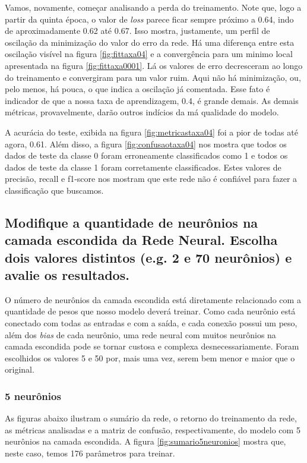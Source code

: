 \documentclass[12pt]{article}
\begin{document}
Vamos, novamente, começar analisando a perda do treinamento. Note que, logo a partir da quinta época, o valor de \textit{loss} parece ficar sempre próximo a 0.64, indo de aproximadamente 0.62 até 0.67. Isso mostra, justamente, um perfil de oscilação da minimização do valor do erro da rede. Há uma diferença entre esta oscilação visível na figura \ref{fig:fittaxa04} e a convergência para um minimo local apresentada na figura \ref{fig:fittaxa0001}. Lá os valores de erro decresceram ao longo do treinamento e convergiram para um valor ruim. Aqui não há minimização, ou, pelo menos, há pouca, o que indica a oscilação já comentada. Esse fato é indicador de que a nossa taxa de aprendizagem, 0.4, é grande demais. As demais métricas, provavelmente, darão outros indícios da má qualidade do modelo.

A acurácia do teste, exibida na figura \ref{fig:metricastaxa04} foi a pior de todas até agora, 0.61. Além disso, a figura \ref{fig:confusaotaxa04} nos mostra que todos os dados de teste da classe 0 foram erroneamente classificados como 1 e todos os dados de teste da classe 1 foram corretamente classificados. Estes valores de precisão, recall e f1-score nos mostram que este rede não é confiável para fazer a classificação que buscamos. 

\subsection{Modifique a quantidade de neurônios na camada escondida da Rede Neural. Escolha dois valores distintos (e.g. 2 e 70 neurônios) e avalie os	resultados.}

O número de neurônios da camada escondida está diretamente relacionado com a quantidade de pesos que nosso modelo deverá treinar. Como cada neurônio está conectado com todas as entradas e com a saída, e cada conexão possui um peso, além dos \textit{bias} de cada neurônio, uma rede neural com muitos neurônios na camada escondida pode se tornar custosa e complexa desnecessariamente. Foram escolhidos os valores 5 e 50 por, mais uma vez, serem bem menor e maior que o original.

\subsubsection{5 neurônios}

As figuras abaixo ilustram o sumário da rede, o retorno do treinamento da rede, as métricas analisadas e a matriz de confusão, respectivamente, do modelo com 5 neurônios na camada escondida. A figura \ref{fig:sumario5neuronios} mostra que, neste caso, temos 176 parâmetros para treinar.
\end{document}
